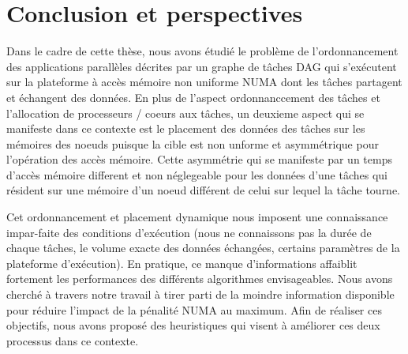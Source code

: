 ﻿\chapter{Conclusion et perspectives}\label{chapter:concusion}
%
Dans le cadre de cette thèse, nous avons étudié le problème de l'ordonnancement des applications parallèles décrites par un graphe de tâches DAG qui s'exécutent sur la plateforme à accès mémoire non uniforme NUMA dont les tâches partagent et échangent des données. En plus de l'aspect ordonnanccement des tâches et l'allocation de processeurs / coeurs aux tâches, un deuxieme aspect qui se manifeste dans ce contexte est le placement des données des tâches sur les mémoires des noeuds puisque la cible est non unforme et asymmétrique pour l'opération des accès mémoire. Cette asymmétrie qui se manifeste par un temps d'accès mémoire different et non néglegeable  pour les données d'une tâches qui résident sur une mémoire d'un noeud différent de celui sur lequel la tâche tourne.

Cet ordonnancement et placement dynamique nous imposent une connaissance impar-faite des conditions d’exécution (nous ne connaissons pas la durée de chaque tâches, le volume exacte des données  échangées, certains paramètres de la plateforme d'exécution). 
En pratique, ce manque d’informations affaiblit fortement les performances des différents algorithmes envisageables.
%
%
%
%
%
%
%
%
%
Nous avons cherché à travers notre travail à tirer parti de la moindre information disponible pour réduire l’impact de la pénalité NUMA au maximum. Afin de réaliser ces objectifs, nous avons proposé des heuristiques qui visent à améliorer ces deux processus dans ce contexte. 

